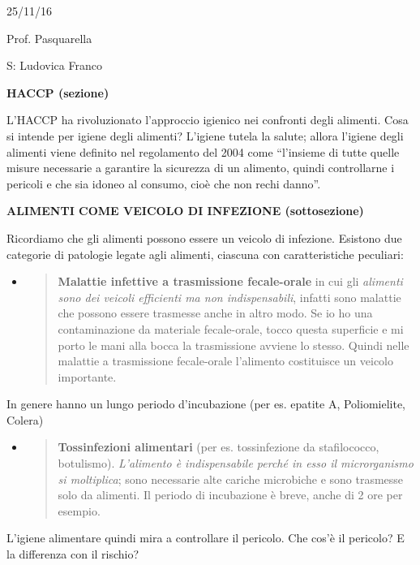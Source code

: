 \documentclass[]{article}
\date{}
\begin{document}
25/11/16

Prof. Pasquarella

S: Ludovica Franco

\textbf{HACCP (sezione)}

L'HACCP ha rivoluzionato l'approccio igienico nei confronti degli
alimenti. Cosa si intende per igiene degli alimenti? L'igiene tutela la
salute; allora l'igiene degli alimenti viene definito nel regolamento
del 2004 come ``l'insieme di tutte quelle misure necessarie a garantire
la sicurezza di un alimento, quindi controllarne i pericoli e che sia
idoneo al consumo, cioè che non rechi danno''.

\textbf{ALIMENTI COME VEICOLO DI INFEZIONE (sottosezione)}

Ricordiamo che gli alimenti possono essere un veicolo di infezione.
Esistono due categorie di patologie legate agli alimenti, ciascuna con
caratteristiche peculiari:

\begin{itemize}
\item
  \begin{quote}
  \textbf{Malattie infettive a trasmissione fecale-orale} in cui gli
  \emph{alimenti sono dei veicoli efficienti ma non indispensabili},
  infatti sono malattie che possono essere trasmesse anche in altro
  modo. Se io ho una contaminazione da materiale fecale-orale, tocco
  questa superficie e mi porto le mani alla bocca la trasmissione
  avviene lo stesso. Quindi nelle malattie a trasmissione fecale-orale
  l'alimento costituisce un veicolo importante.
  \end{quote}
\end{itemize}

In genere hanno un lungo periodo d'incubazione (per es. epatite A,
Poliomielite, Colera)

\begin{itemize}
\item
  \begin{quote}
  \textbf{Tossinfezioni alimentari} (per es. tossinfezione da
  stafilococco, botulismo). \emph{L'alimento è indispensabile perché in
  esso il microrganismo si moltiplica}; sono necessarie alte cariche
  microbiche e sono trasmesse solo da alimenti. Il periodo di
  incubazione è breve, anche di 2 ore per esempio.
  \end{quote}
\end{itemize}

L'igiene alimentare quindi mira a controllare il pericolo. Che cos'è il
pericolo? E la differenza con il rischio?
\end{document}
